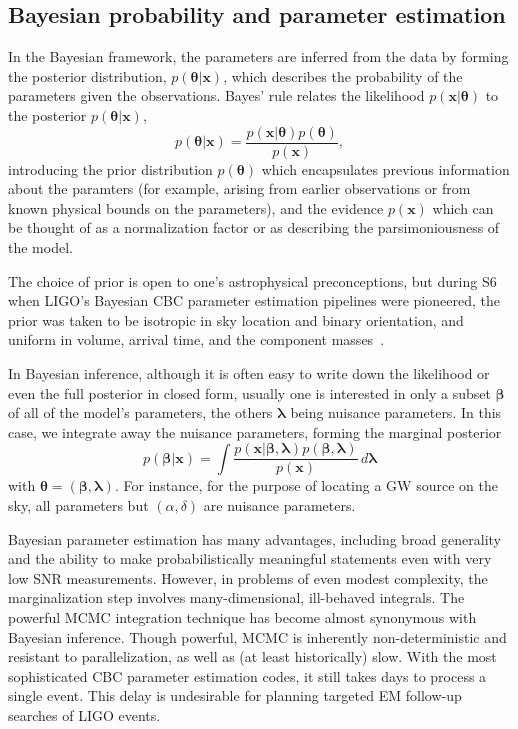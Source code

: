 \documentclass{iopart}
\begin{document}
\subsection{Bayesian probability and parameter estimation}

In the Bayesian framework, the parameters are inferred from the data by forming the posterior distribution, $p(\boldsymbol\theta|\mathbf x)$, which describes the probability of the parameters given the observations. Bayes' rule relates the likelihood $p(\mathbf x|\boldsymbol\theta)$ to the posterior $p(\boldsymbol\theta|\mathbf x)$,
%
\begin{equation}\label{bayes}
p(\boldsymbol\theta|\mathbf x) = \frac{p(\mathbf x|\boldsymbol\theta) p(\boldsymbol\theta)}{p(\mathbf x)},
\end{equation}
%
introducing the prior distribution $p(\boldsymbol\theta)$ which encapsulates previous information about the paramters (for example, arising from earlier observations or from known physical bounds on the parameters), and the evidence $p(\mathbf x)$ which can be thought of as a normalization factor or as describing the parsimoniousness of the model.

The choice of prior is open to one's astrophysical preconceptions, but during \ac{S6} when \ac{LIGO}'s Bayesian \ac{CBC} parameter estimation pipelines were pioneered, the prior was taken to be isotropic in sky location and binary orientation, and uniform in volume, arrival time, and the component masses~\cite{2013arXiv1304.1775T}.

In Bayesian inference, although it is often easy to write down the likelihood or even the full posterior in closed form, usually one is interested in only a subset $\boldsymbol\beta$ of all of the model's parameters, the others $\boldsymbol\lambda$ being nuisance parameters. In this case, we integrate away the nuisance parameters, forming the marginal posterior
%
\begin{equation}\label{eq:marginal-posterior}
    p(\boldsymbol\beta|\mathbf x) = \int \frac{p(\mathbf x|\boldsymbol\beta,\boldsymbol\lambda) p(\boldsymbol\beta,\boldsymbol\lambda)}{p(\mathbf x)} \,d\boldsymbol\lambda
\end{equation}
%
with $\boldsymbol\theta = (\boldsymbol\beta, \boldsymbol\lambda)$. For instance, for the purpose of locating a \ac{GW} source on the sky, all parameters but $(\alpha, \delta)$ are nuisance parameters.

Bayesian parameter estimation has many advantages, including broad generality and the ability to make probabilistically meaningful statements even with very low \ac{SNR} measurements. However, in problems of even modest complexity, the marginalization step involves many-dimensional, ill-behaved integrals. The powerful \ac{MCMC} integration technique has become almost synonymous with Bayesian inference. Though powerful, \ac{MCMC} is inherently non-deterministic and resistant to parallelization, as well as (at least historically) slow. With the most sophisticated \ac{CBC} parameter estimation codes, it still takes days to process a single event. This delay is undesirable for planning targeted \ac{EM} follow\nobreakdashes-up searches of \ac{LIGO} events.
\end{document}
